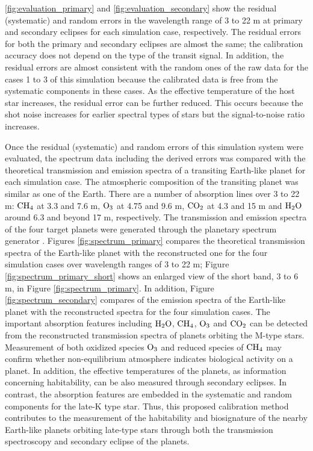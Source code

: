\documentclass{aastex62}
\begin{document}
\ref{fig:evaluation_primary} and \ref{fig:evaluation_secondary} show the residual (systematic) and random errors in the wavelength range of 3 to 22 \textmu m at primary and secondary eclipses for each simulation case, respectively. The residual errors for both the primary and secondary eclipses are almost the same; the calibration accuracy does not depend on the type of the transit signal. In addition, the residual errors are almost consistent with the random ones of the raw data for the cases 1 to 3 of this simulation because the calibrated data is free from the systematic components in these cases. As the effective temperature of the host star increases, the residual error can be further reduced. This occurs because the shot noise increases for earlier spectral types of stars but the signal-to-noise ratio increases.

Once the residual (systematic) and random errors of this simulation system were evaluated, the spectrum data including the derived errors was compared with the theoretical transmission and emission spectra of a transiting Earth-like planet for each simulation case. The atmospheric composition of the transiting planet was similar as one of the Earth. There are a number of absorption lines over 3 to 22 \textmu m: $\rm CH_4$ at 3.3 and 7.6 \textmu m, $\rm O_3$ at 4.75 and 9.6 \textmu m, $\rm CO_2$ at 4.3 and 15 \textmu m and $\rm H_{2}O$ around 6.3 and beyond 17 \textmu m, respectively. The transmission and emission spectra of the four target planets were generated through the planetary spectrum generator \citep{2015Sci...348..218V}. Figures \ref{fig:spectrum_primary} compares the theoretical transmission spectra of the Earth-like planet with the reconstructed one for the four simulation cases over wavelength ranges of 3 to 22 \textmu m; Figure \ref{fig:spectrum_primary_short} shows an enlarged view of the short band, 3 to 6 \textmu m, in Figure \ref{fig:spectrum_primary}. In addition, Figure \ref{fig:spectrum_secondary} compares of the emission spectra of the Earth-like planet with the reconstructed spectra for the four simulation cases. The important absorption features including $\rm H_{2}O$, $\rm CH_{4}$, $\rm O_{3}$ and $\rm CO_{2}$ can be detected from the reconstructed transmission spectra of planets orbiting the M-type stars. Measurement of both oxidized species $\rm O_3$ and reduced species of $\rm CH_4$ may confirm whether non-equilibrium atmosphere indicates biological activity on a planet. In addition, the effective temperatures of the planets, as information concerning habitability, can be also measured through secondary eclipses. In contrast, the absorption features are embedded in the systematic and random components for the late-K type star. Thus, this proposed calibration method contributes to the measurement of the habitability and biosignature of the nearby Earth-like planets orbiting late-type stars through both the transmission spectroscopy and secondary eclipse of the planets.
\end{document}
